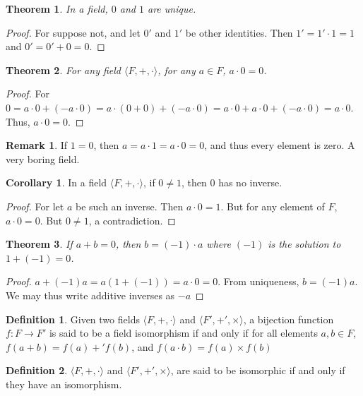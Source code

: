\documentclass[oneside]{book}
\newtheorem{theorem}{Theorem}[section]
\theoremstyle{definition}
\newtheorem{definition}{Definition}[section]
\newtheorem{corollary}{Corollary}[section]
\newtheorem{remark}{Remark}[section]
\begin{document}
\begin{theorem}
In a field, $0$ and $1$ are unique.
\end{theorem}
\begin{proof}
For suppose not, and let $0'$ and $1'$ be other identities. Then $1'=1'\cdot 1 = 1$ and $0'=0'+0=0$.
\end{proof}

\begin{theorem}
For any field $\langle F,+,\cdot \rangle$, for any $a\in F$, $a\cdot 0 = 0$.
\end{theorem}
\begin{proof}
For $0 = a\cdot 0 + (-a\cdot 0) = a\cdot(0+0) +(-a\cdot 0) = a\cdot 0 + a\cdot 0 + (-a\cdot 0) = a\cdot 0$. Thus, $a\cdot 0 = 0$.
\end{proof}

\begin{remark}
If $1=0$, then $a=a\cdot 1 = a\cdot 0 = 0$, and thus every element is zero. A very boring field.
\end{remark}

\begin{corollary}
In a field $\langle F, +,\cdot \rangle$, if $0\ne 1$, then $0$ has no inverse.
\end{corollary}
\begin{proof}
For let $a$ be such an inverse. Then $a\cdot 0 = 1$. But for any element of $F$, $a \cdot 0 = 0$. But $0\ne 1$, a contradiction.
\end{proof}

\begin{theorem}
If $a+b = 0$, then $b= (-1)\cdot a$ where $(-1)$ is the solution to $1+(-1)=0$.
\end{theorem}
\begin{proof}
$a+(-1)a = a(1+(-1)) = a\cdot 0 = 0$. From uniqueness, $b=(-1)a$. We may thus write additive inverses as $-a$
\end{proof}

\begin{definition}
Given two fields $\langle F,+,\cdot \rangle$ and $\langle F', +',\times \rangle$, a bijection function $f:F\rightarrow F'$ is said to be a field isomorphism if and only if for all elements $a,b\in F$, $f(a+b)=f(a)+'f(b)$, and $f(a\cdot b) = f(a)\times f(b)$
\end{definition}

\begin{definition}
$\langle F,+,\cdot \rangle$ and $\langle F', +',\times \rangle$, are said to be isomorphic if and only if they have an isomorphism.
\end{definition}
\end{document}
